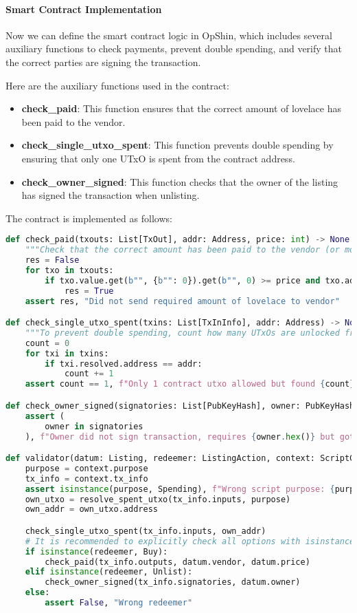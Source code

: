 \paragraph{Smart Contract Implementation}
Now we can define the smart contract logic in OpShin, which includes several auxiliary functions to check payments, prevent double spending, and verify that the correct parties are signing the transaction.

Here are the auxiliary functions used in the contract:

\begin{itemize}
    \item \textbf{check\_paid}: This function ensures that the correct amount of lovelace has been paid to the vendor.
    \item \textbf{check\_single\_utxo\_spent}: This function prevents double spending by ensuring that only one UTxO is spent from the contract address.
    \item \textbf{check\_owner\_signed}: This function checks that the owner of the listing has signed the transaction when unlisting.
\end{itemize}

The contract is implemented as follows:

\begin{lstlisting}[language=python, caption=OpShin Marketplace Smart Contract]
def check_paid(txouts: List[TxOut], addr: Address, price: int) -> None:
    """Check that the correct amount has been paid to the vendor (or more)"""
    res = False
    for txo in txouts:
        if txo.value.get(b"", {b"": 0}).get(b"", 0) >= price and txo.address == addr:
            res = True
    assert res, "Did not send required amount of lovelace to vendor"

def check_single_utxo_spent(txins: List[TxInInfo], addr: Address) -> None:
    """To prevent double spending, count how many UTxOs are unlocked from the contract address"""
    count = 0
    for txi in txins:
        if txi.resolved.address == addr:
            count += 1
    assert count == 1, f"Only 1 contract utxo allowed but found {count}"

def check_owner_signed(signatories: List[PubKeyHash], owner: PubKeyHash) -> None:
    assert (
        owner in signatories
    ), f"Owner did not sign transaction, requires {owner.hex()} but got {[s.hex() for s in signatories]}"

def validator(datum: Listing, redeemer: ListingAction, context: ScriptContext) -> None:
    purpose = context.purpose
    tx_info = context.tx_info
    assert isinstance(purpose, Spending), f"Wrong script purpose: {purpose}"
    own_utxo = resolve_spent_utxo(tx_info.inputs, purpose)
    own_addr = own_utxo.address

    check_single_utxo_spent(tx_info.inputs, own_addr)
    # It is recommended to explicitly check all options with isinstance for user input
    if isinstance(redeemer, Buy):
        check_paid(tx_info.outputs, datum.vendor, datum.price)
    elif isinstance(redeemer, Unlist):
        check_owner_signed(tx_info.signatories, datum.owner)
    else:
        assert False, "Wrong redeemer"
\end{lstlisting}

